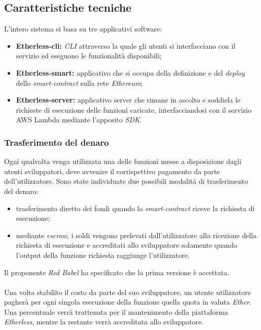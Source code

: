 \subsection{Caratteristiche tecniche}

L'intero sistema si basa su tre applicativi software:
	\begin{itemize}
		\item \textbf{Etherless-cli:} \textit{CLI\glo} attraverso la quale gli utenti si interfacciano con il servizio ed eseguono le funzionalità disponibili;
		\item \textbf{Etherless-smart:} applicativo che si occupa della definizione e del \textit{deploy\glo} dello \textit{smart-contract} sulla rete \textit{Ethereum\glos};
		\item \textbf{Etherless-server:} applicativo server che rimane in ascolto e soddisfa le richieste di esecuzione delle funzioni caricate, interfacciandosi con il servizio AWS Lambda mediante l'apposito \textit{SDK\glos}.
	\end{itemize}

\subsubsection{Trasferimento del denaro}
Ogni qualvolta venga utilizzata una delle funzioni messe a disposizione dagli utenti sviluppatori, deve avvenire il corrispettivo pagamento da parte dell'utilizzatore. Sono state individuate due possibili modalità di trasferimento del denaro:
\begin{itemize}
	\item trasferimento diretto dei fondi quando lo \textit{smart-contract\glo} riceve la richiesta di esecuzione;
	\item mediante \textit{escrow\glos}, i soldi vengono prelevati dall'utilizzatore alla ricezione della richiesta di esecuzione e accreditati allo sviluppatore solamente quando l'output della funzione richiesta raggiunge l'utilizzatore.
\end{itemize}
Il proponente \textit{Red Babel} ha specificato che la prima versione è accettata.\\\\
Una volta stabilito il costo da parte del suo sviluppatore, un utente utilizzatore pagherà per ogni singola esecuzione della funzione quella quota in valuta \textit{Ether\glos}. Una percentuale verrà trattenuta per il mantenimento della piattaforma \textit{Etherless}, mentre la restante verrà accreditata allo sviluppatore.

